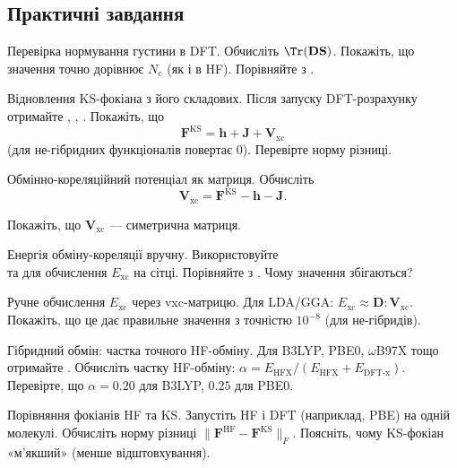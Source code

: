 \subsection*{Практичні завдання}

\begin{tasks}

\item Перевірка нормування густини в DFT.
Обчисліть $\Tr(\mathbf{D}\mathbf{S})$. Покажіть, що значення точно дорівнює $N_e$ (як і в HF). Порівняйте з .

\item Відновлення KS-фокіана з його складових.
Після запуску DFT-розрахунку отримайте , , .
Покажіть, що
\[
\mathbf{F}^{\text{KS}} = \mathbf{h} + \mathbf{J} + \mathbf{V}_{\text{xc}}
\]
(для не-гібридних функціоналів  повертає $0$). Перевірте норму різниці.

\item Обмінно-кореляційний потенціал як матриця.
Обчисліть
\[\mathbf{V}_{\text{xc}} = \mathbf{F}^{\text{KS}} - \mathbf{h} - \mathbf{J}.\]

Покажіть, що $\mathbf{V}_\text{xc}$ --- симетрична матриця.

\item Енергія обміну-кореляції вручну.
Використовуйте \\
 та  для обчислення $E_{\text{xc}}$ на сітці.
Порівняйте з . Чому значення збігаються?

\item Ручне обчислення $E_{\text{xc}}$ через vxc-матрицю.
Для LDA/GGA: $E_{\text{xc}} \approx \mathbf{D} : \mathbf{V}_{\text{xc}}$.
Покажіть, що це дає правильне значення з точністю $10^{-8}$ (для не-гібридів).

\item Гібридний обмін: частка точного HF-обміну.
Для B3LYP, PBE0, $\omega$B97X тощо отримайте .
Обчисліть частку HF-обміну: $\alpha = E_{\text{HFX}} / (E_{\text{HFX}} + E_{\text{DFT-x}})$.
Перевірте, що $\alpha = 0.20$ для B3LYP, $0.25$ для PBE0.

\item Порівняння фокіанів HF та KS.
Запустіть HF і DFT (наприклад, PBE) на одній молекулі.
Обчисліть норму різниці $\|\mathbf{F}^{\text{HF}} - \mathbf{F}^{\text{KS}}\|_F$.
Поясніть, чому KS-фокіан «м’якший» (менше відштовхування).


\end{tasks}
